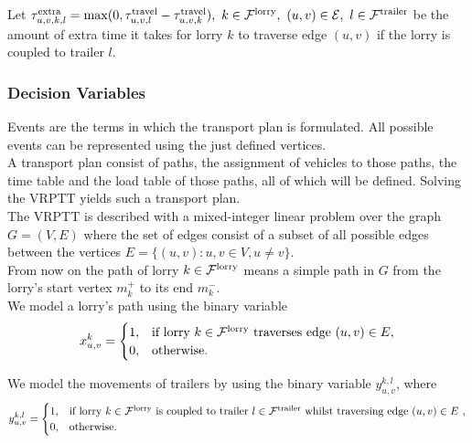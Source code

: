 Let
$
  \tau^{\rm extra }_{u,v,k,l} =
  \max(0, \tau_{u,v,l}^{\rm travel} - \tau_{u,v,k}^{\rm travel} ),
\ k \in \mathcal{F}^{\rm lorry},
\ (u,v) \in \mathcal E,
\  l \in \mathcal{F}^{\rm trailer}$
be the amount of extra time it takes for lorry
$k $
to traverse edge
$(u,v)$
if the lorry is coupled to trailer
$l $. \\





\subsubsection{Decision Variables}


Events are the terms in which the transport plan is formulated.
All possible events can be represented using the just defined vertices. \\

A transport plan consist of paths, the assignment of vehicles to those paths, the time table and the load table of those paths, all of which will be defined.
Solving the VRPTT yields such a transport plan.\\

The VRPTT is described with a mixed-integer linear problem over the graph
$G=(V,E)$
where the set of edges consist of a subset of all possible edges between the vertices
$ E = \{ (u,v): u,v \in V , u \neq v \} $. \\

From now on the path
of lorry
$k \in \mathcal F^{\rm lorry}$
means a simple path in $G$ from the lorry's start vertex $m^+_k$ to its end $m^-_k$. \\

We model a lorry's path using the binary variable
\begin{align}
  x^{k}_{u,v} =  \begin{cases}
  1 ,& \text{if lorry $k \in \mathcal F^{\rm lorry}$ traverses edge $(u,v) \in  E$}, \\
  0,              & \text{otherwise. }
  \end{cases}
\end{align}



We model the movements of trailers by using the binary variable
$y^{k,l}_{u,v} $, where
\begin{align}
  y^{k,l}_{u,v} =  \begin{cases}
  1 ,& \text{if lorry $k \in \mathcal F^{\rm lorry}$ is coupled to trailer $l \in \mathcal F^{\rm trailer} $ whilst traversing edge $(u,v) \in E$ }, \\
  0,              & \text{otherwise. }
  \end{cases}
\end{align}

